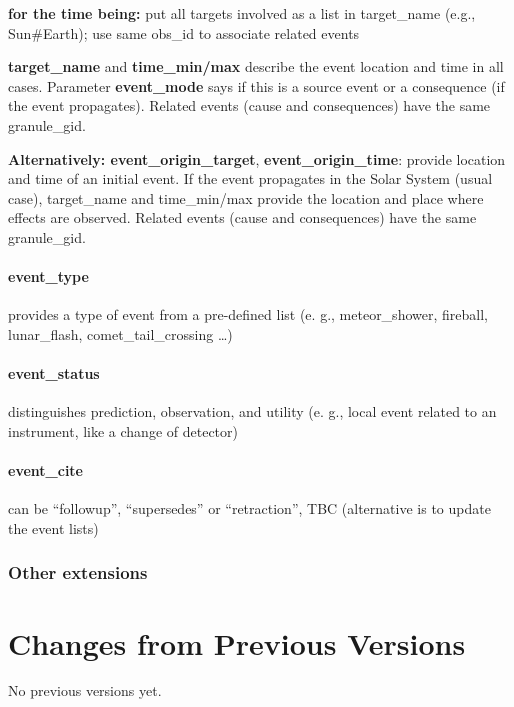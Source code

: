 \documentclass[11pt,a4paper]{ivoa}
\begin{document}
\textbf{for the time being:} put all targets involved as a list in target\_name (e.g., Sun\#Earth); use same obs\_id to associate related events

\textbf{ target\_name }and\textbf{ time\_min/max} describe the event location and time in all cases. Parameter \textbf{event\_mode} says if this is a source event or a consequence (if the event propagates). Related events (cause and consequences) have the same granule\_gid.

\textbf{\textbf{Alternatively}: event\_origin\_target}, \textbf{event\_origin\_time}: provide location and time of an initial event. If the event propagates in the Solar System (usual case), target\_name and time\_min/max provide the location and place where effects are observed. Related events (cause and consequences) have the same granule\_gid.

\paragraph{event\_type}

provides a type of event from a pre-defined list (e. g., meteor\_shower, fireball, lunar\_flash, comet\_tail\_crossing …)

\paragraph{event\_status}

distinguishes prediction, observation, and utility (e. g., local event related to an instrument, like a change of detector)

\paragraph{event\_cite}

can be ``followup'', ``supersedes'' or ``retraction'', TBC (alternative is to update the event lists)

\subsubsection{Other extensions\\}



\appendix
\section{Changes from Previous Versions}

No previous versions yet.  



\end{document}
